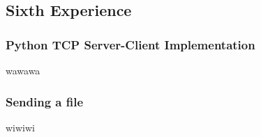 \subsection{Sixth Experience}

\subsubsection{Python TCP Server-Client Implementation}
wawawa

\subsubsection{Sending a file}
wiwiwi

